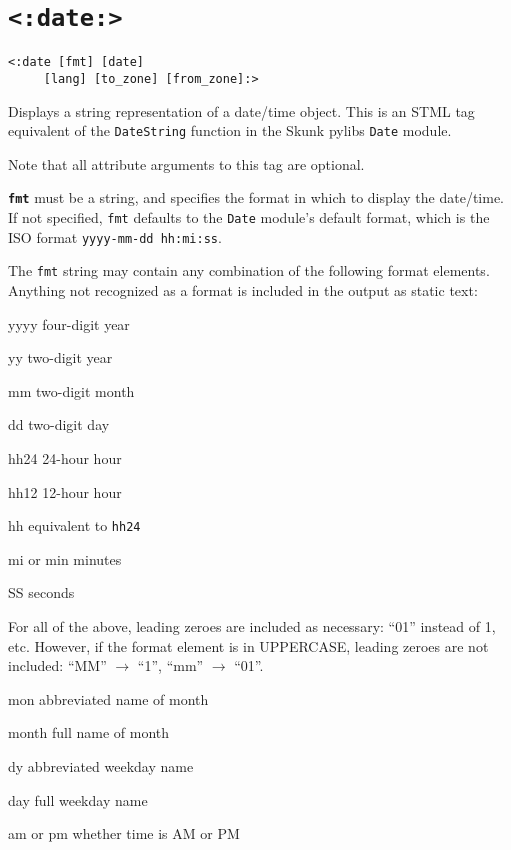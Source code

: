 \documentclass{manual}
\begin{document}
\section{\texttt{<:date:>}}
\label{tagdate}

\begin{verbatim}
<:date [fmt] [date] 
     [lang] [to_zone] [from_zone]:>
\end{verbatim}


Displays a string representation of a date/time object. This is 
an STML tag equivalent of the \texttt{DateString} function
in the Skunk pylibs \texttt{Date} module.

Note that all attribute arguments to this tag are optional.

\texttt{\textbf{fmt}} must be a string, and specifies the format in 
which to display the date/time. If not specified, \texttt{fmt} defaults to
the \texttt{Date} module's default format, which is the ISO format
\texttt{yyyy-mm-dd hh:mi:ss}.

    The \texttt{fmt} string may contain any combination of the 
    following format elements. Anything not recognized 
    as a format is included in the output as static text:

\begin{argdesc}
\item[yyyy] four-digit year
\item[yy] two-digit year
\item[mm] two-digit month
\item[dd] two-digit day
\item[hh24] 24-hour hour
\item[hh12] 12-hour hour
\item[hh] equivalent to \texttt{hh24}
\item[mi] or min minutes
\item[SS] seconds
\end{argdesc}

    For all of the above, leading zeroes are included 
    as necessary: ``01'' instead of 1, etc. However, 
    if the format element is in UPPERCASE, leading zeroes 
    are not included: ``MM'' $\rightarrow$ ``1'', ``mm'' $\rightarrow$ ``01''.

\begin{argdesc}
\item[mon] abbreviated name of month
\item[month] full name of month
\item[dy] abbreviated weekday name
\item[day] full weekday name
\item[am or pm] whether time is AM or PM
\end{argdesc}
\end{document}
